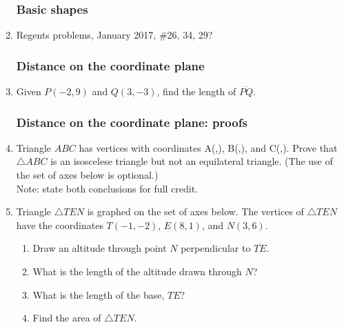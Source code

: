 \documentclass[12pt, twoside]{article}
\begin{document}
\begin{enumerate}
  \subsubsection*{Basic shapes}
  \item Regents problems, January 2017, \#26, 34, 29?

  \subsubsection*{Distance on the coordinate plane}
  \item Given $P(-2,9)$ and $Q(3,-3)$, find the length of $\overline{PQ}$.

  \subsubsection*{Distance on the coordinate plane: proofs}

    \item Triangle $ABC$ has vertices with coordinates A(,), B(,), and C(,). Prove that $\triangle ABC$ is an isoscelese triangle but not an equilateral triangle. (The use of the set of axes below is optional.)\\
    Note: state both conclusions for full credit.

    \item Triangle $\triangle TEN$ is graphed on the set of axes below. The vertices of $\triangle TEN$ have the coordinates $T(-1,-2)$, $E(8,1)$, and $N(3,6)$.
      \begin{center} %
      \end{center}
      \begin{enumerate}
        \item Draw an altitude through point $N$ perpendicular to $\overline{TE}$.
        \item What is the length of the altitude drawn through $N$?
        \item What is the length of the base, $TE$?
        \item Find the area of  $\triangle TEN$.
      \end{enumerate}


\end{enumerate}
\end{document}
